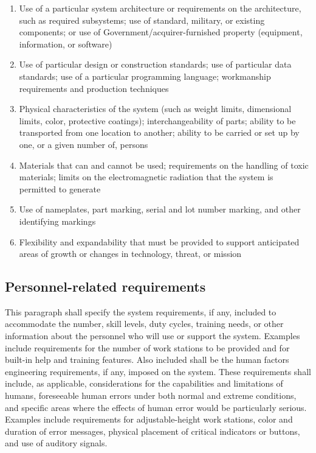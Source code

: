 \begin{enumerate}
\itemsep1pt\parskip0pt
\item
  Use of a particular system architecture or requirements on the
  architecture, such as required subsystems; use of standard, military,
  or existing components; or use of Government/acquirer-furnished
  property (equipment, information, or software)
\item
  Use of particular design or construction standards; use of particular
  data standards; use of a particular programming language; workmanship
  requirements and production techniques
\item
  Physical characteristics of the system (such as weight limits,
  dimensional limits, color, protective coatings); interchangeability of
  parts; ability to be transported from one location to another; ability
  to be carried or set up by one, or a given number of, persons
\item
  Materials that can and cannot be used; requirements on the handling of
  toxic materials; limits on the electromagnetic radiation that the
  system is permitted to generate
\item
  Use of nameplates, part marking, serial and lot number marking, and
  other identifying markings
\item
  Flexibility and expandability that must be provided to support
  anticipated areas of growth or changes in technology, threat, or
  mission
\end{enumerate}

\subsection{Personnel-related requirements}

This paragraph shall specify the system requirements, if any, included
to accommodate the number, skill levels, duty cycles, training needs, or
other information about the personnel who will use or support the
system. Examples include requirements for the number of work stations to
be provided and for built-in help and training features. Also included
shall be the human factors engineering requirements, if any, imposed on
the system. These requirements shall include, as applicable,
considerations for the capabilities and limitations of humans,
foreseeable human errors under both normal and extreme conditions, and
specific areas where the effects of human error would be particularly
serious. Examples include requirements for adjustable-height work
stations, color and duration of error messages, physical placement of
critical indicators or buttons, and use of auditory signals.

